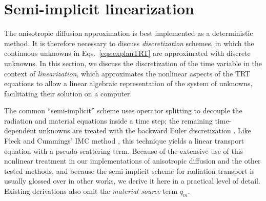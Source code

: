 \section{Semi-implicit linearization}\label{sec:bgSemiImplicit}

The anisotropic diffusion approximation is best implemented as a deterministic
method. It is
therefore necessary to discuss \emph{discretization} schemes,
in which the continuous unknowns in Eqs.~\eqref{eqs:explanTRT} are approximated
with discrete unknowns. In this section, we discuss the discretization of the
time variable in the context of \emph{linearization}, which approximates
the nonlinear aspects of the TRT equations to allow a linear algebraic
representation of the system of unknowns, facilitating their solution on a
computer.

The common
``semi-implicit'' scheme uses operator splitting
to decouple the radiation and material equations inside a time step; the
remaining time-dependent unknowns are treated with the backward Euler
discretization \cite{Kno1999a,Kno2001,Low2004}.
Like Fleck and Cummings' IMC method \cite{Fle1971}, this technique
yields a linear transport equation with a pseudo-scattering term. Because of the
extensive use of this
nonlinear treatment in our implementations of anisotropic diffusion and the
other tested methods, and because the semi-implicit scheme for radiation
transport is usually glossed over in other works, we derive
it here in a practical level of detail. Existing derivations also omit the
\emph{material source} term $q_m$.

